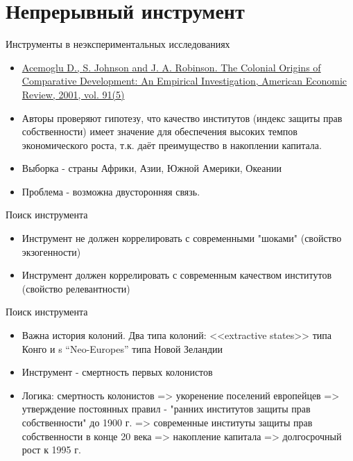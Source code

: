 \section{Непрерывный инструмент}

\begin{frame}{Инструменты в неэкспериментальных исследованиях}


  \begin{itemize}
      \item \href{https://www.aeaweb.org/articles?id=10.1257/aer.91.5.1369}{Acemoglu D., S. Johnson and J. A. Robinson. The Colonial Origins of Comparative Development: An Empirical Investigation, American Economic Review, 2001, vol. 91(5)}
      \item Авторы проверяют гипотезу, что качество институтов (индекс защиты прав собственности) имеет значение для обеспечения высоких темпов экономического роста, т.к. даёт преимущество в накоплении капитала.
      \item Выборка - страны Африки, Азии, Южной Америки, Океании
      \item Проблема - возможна двусторонняя связь.
  \end{itemize}
\end{frame}

\begin{frame}{Поиск инструмента}
  \begin{itemize}
      \item Инструмент не должен коррелировать с современными "шоками" (свойство экзогенности)
      \item Инструмент должен коррелировать с современным качеством институтов (свойство релевантности)
       
 \end{itemize}
\end{frame}

\begin{frame}{Поиск инструмента}
  \begin{itemize}
    \item Важна история колоний. Два типа колоний: <<extractive states>> типа Конго и s “Neo-Europes” типа Новой Зеландии
      \item Инструмент - смертность первых колонистов
      \item Логика: смертность колонистов => укоренение поселений европейцев => утверждение постоянных правил - "ранних институтов защиты прав собственности" до 1900 г. => современные институты защиты прав собственности в конце 20 века => накопление капитала => долгосрочный рост к 1995 г. 
 \end{itemize}
\end{frame}

